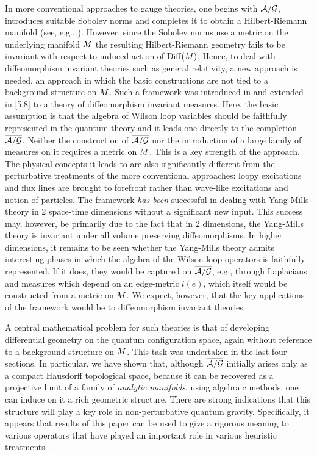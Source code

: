 In more conventional approaches to gauge theories, one begins with
$\ag$, introduces suitable Sobolev norms and completes it to obtain a
Hilbert-Riemann manifold (see, e.g., \cite{AM}). However, since the
Sobolev norms use a metric on the underlying manifold $\S$ the
resulting Hilbert-Riemann geometry fails to be invariant with respect
to induced action of Diff$(\S)$. Hence, to deal with diffeomorphism
invariant theories such as general relativity, a new approach is
needed, an approach in which the basic constructions are not tied to a
background structure on $\S$. Such a framework was introduced in
\cite{AI,AL1} and extended in [5,8] to a theory of diffeomorphism
invariant measures. Here, the basic assumption is that the algebra of
Wilson loop variables should be faithfully represented in the quantum
theory and it leads one directly to the completion $\agb$. Neither the
construction of $\agb$ nor the introduction of a large family of
measures on it requires a metric on $\S$. This is a key strength of
the approach. The physical concepts it leads to are also significantly
different from the perturbative treatments of the more conventional
approaches: loopy excitations and flux lines are brought to forefront
rather than wave-like excitations and notion of particles.  The
framework {\it has been} successful in dealing with Yang-Mills theory
in 2 space-time dimensions \cite{ALMMT1} without a significant new
input. This success may, however, be primarily due to the fact that in
2 dimensions, the Yang-Mills theory is invariant under all volume
preserving diffeomorphisms. In higher dimensions, it remains to be
seen whether the Yang-Mills theory admits interesting phases in which
the algebra of the Wilson loop operators is faithfully represented. If
it does, they would be captured on $\agb$, e.g., through Laplacians
and measures which depend on an edge-metric $l(e)$, which itself would
be constructed from a metric on $\S$. We expect, however, that the key
applications of the framework would be to diffeomorphism invariant
theories.

A central mathematical problem for such theories is that of developing
differential geometry on the quantum configuration space, again
without reference to a background structure on $\S$.  This task was
undertaken in the last four sections. In particular, we have shown
that, although $\agb$ initially arises only as a compact Hausdorff
topological space, because it can be recovered as a projective limit
of a family of {\it analytic manifolds}, using algebraic methods, one
can induce on it a rich geometric structure.  There are strong
indications that this structure will play a key role in
non-perturbative quantum gravity.  Specifically, it appears that
results of this paper can be used to give a rigorous meaning to
various operators that have played an important role in various
heuristic treatments \cite{AA3,RS}.

